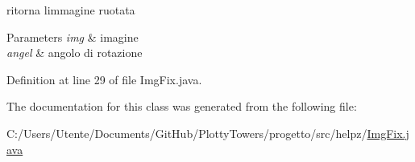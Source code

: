 ritorna l\textquotesingle{}immagine ruotata 


\begin{DoxyParams}{Parameters}
{\em img} & imagine \\
\hline
{\em angel} & angolo di rotazione \\
\hline
\end{DoxyParams}


Definition at line 29 of file Img\+Fix.\+java.



The documentation for this class was generated from the following file\+:\begin{DoxyCompactItemize}
\item 
C\+:/\+Users/\+Utente/\+Documents/\+Git\+Hub/\+Plotty\+Towers/progetto/src/helpz/\hyperlink{_img_fix_8java}{Img\+Fix.\+java}\end{DoxyCompactItemize}
